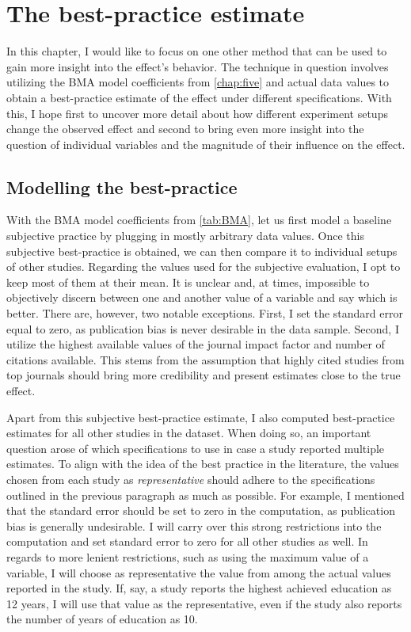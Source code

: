 \chapter{The best-practice estimate}
\label{chap:six}

In this chapter, I would like to focus on one other method that can be used to gain more insight into the effect's behavior. The technique in question involves utilizing the \ac{BMA} model coefficients from \autoref{chap:five} and actual data values to obtain a best-practice estimate of the effect under different specifications. With this, I hope first to uncover more detail about how different experiment setups change the observed effect and second to bring even more insight into the question of individual variables and the magnitude of their influence on the effect.


\section{Modelling the best-practice}
\label{sec:best_practice_base}

With the \ac{BMA} model coefficients from \autoref{tab:BMA}, let us first model a baseline subjective practice by plugging in mostly arbitrary data values. Once this subjective best-practice is obtained, we can then compare it to individual setups of other studies. Regarding the values used for the subjective evaluation, I opt to keep most of them at their mean. It is unclear and, at times, impossible to objectively discern between one and another value of a variable and say which is better. There are, however, two notable exceptions. First, I set the standard error equal to zero, as publication bias is never desirable in the data sample. Second, I utilize the highest available values of the journal impact factor and number of citations available. This stems from the assumption that highly cited studies from top journals should bring more credibility and present estimates close to the true effect. 

Apart from this subjective best-practice estimate, I also computed best-practice estimates for all other studies in the dataset. When doing so, an important question arose of which specifications to use in case a study reported multiple estimates. To align with the idea of the best practice in the literature, the values chosen from each study as \textit{representative} should adhere to the specifications outlined in the previous paragraph as much as possible. For example, I mentioned that the standard error should be set to zero in the computation, as publication bias is generally undesirable. I will carry over this strong restrictions into the computation and set standard error to zero for all other studies as well. In regards to more lenient restrictions, such as using the maximum value of a variable, I will choose as representative the value from among the actual values reported in the study. If, say, a study reports the highest achieved education as 12 years, I will use that value as the representative, even if the study also reports the number of years of education as 10.

